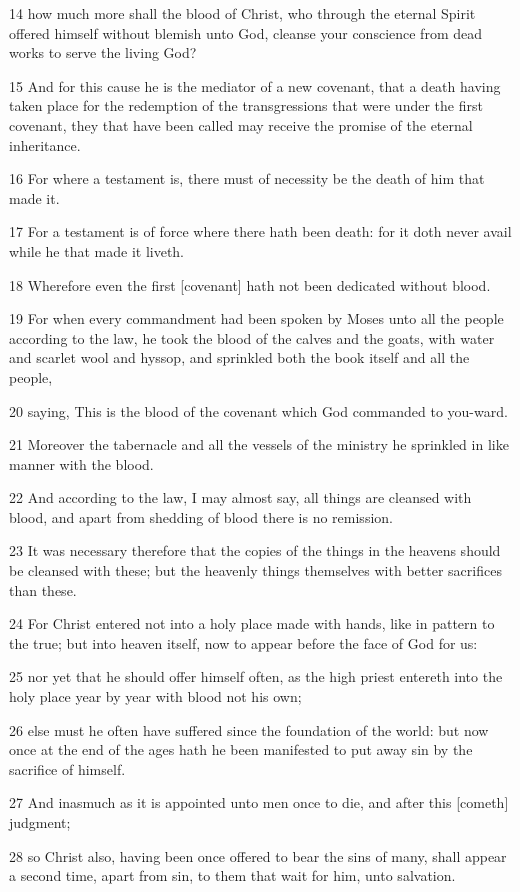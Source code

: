 \par 14 how much more shall the blood of Christ, who through the eternal Spirit offered himself without blemish unto God, cleanse your conscience from dead works to serve the living God?
\par 15 And for this cause he is the mediator of a new covenant, that a death having taken place for the redemption of the transgressions that were under the first covenant, they that have been called may receive the promise of the eternal inheritance.
\par 16 For where a testament is, there must of necessity be the death of him that made it.
\par 17 For a testament is of force where there hath been death: for it doth never avail while he that made it liveth.
\par 18 Wherefore even the first [covenant] hath not been dedicated without blood.
\par 19 For when every commandment had been spoken by Moses unto all the people according to the law, he took the blood of the calves and the goats, with water and scarlet wool and hyssop, and sprinkled both the book itself and all the people,
\par 20 saying, This is the blood of the covenant which God commanded to you-ward.
\par 21 Moreover the tabernacle and all the vessels of the ministry he sprinkled in like manner with the blood.
\par 22 And according to the law, I may almost say, all things are cleansed with blood, and apart from shedding of blood there is no remission.
\par 23 It was necessary therefore that the copies of the things in the heavens should be cleansed with these; but the heavenly things themselves with better sacrifices than these.
\par 24 For Christ entered not into a holy place made with hands, like in pattern to the true; but into heaven itself, now to appear before the face of God for us:
\par 25 nor yet that he should offer himself often, as the high priest entereth into the holy place year by year with blood not his own;
\par 26 else must he often have suffered since the foundation of the world: but now once at the end of the ages hath he been manifested to put away sin by the sacrifice of himself.
\par 27 And inasmuch as it is appointed unto men once to die, and after this [cometh] judgment;
\par 28 so Christ also, having been once offered to bear the sins of many, shall appear a second time, apart from sin, to them that wait for him, unto salvation.

